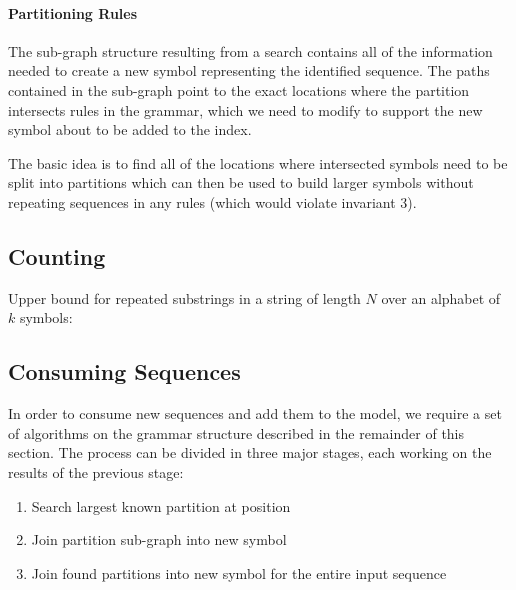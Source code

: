 \paragraph{Partitioning Rules}
The sub-graph structure resulting from a search contains all of the information needed to create a new symbol representing the identified sequence. The paths contained in the sub-graph point to the exact locations where the partition intersects rules in the grammar, which we need to modify to support the new symbol about to be added to the index.

The basic idea is to find all of the locations where intersected symbols need to be split into partitions which can then be used to build larger symbols without repeating sequences in any rules (which would violate invariant 3).

\subsection{Counting}
Upper bound for repeated substrings in a string of length $N$ over an alphabet of $k$ symbols:


\subsection{Consuming Sequences}
In order to consume new sequences and add them to the model, we require a set of algorithms on the grammar structure described in the remainder of this section. The process can be divided in three major stages, each working on the results of the previous stage:
\begin{enumerate}
\item Search largest known partition at position
\item Join partition sub-graph into new symbol
\item Join found partitions into new symbol for the entire input sequence
\end{enumerate}

